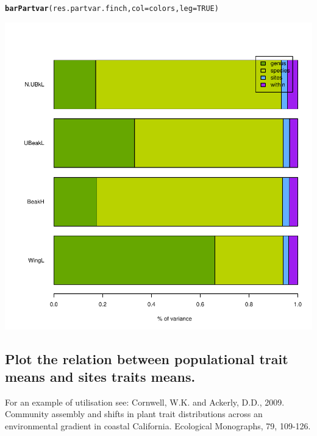 \documentclass[12pt]{article}\usepackage[]{graphicx}\usepackage[]{color}
\makeatletter
\def\maxwidth{ %
  \ifdim\Gin@nat@width>\linewidth
    \linewidth
  \else
    \Gin@nat@width
  \fi
}
\newcommand{\hlnum}[1]{\textcolor[rgb]{0.686,0.059,0.569}{#1}}%
\newcommand{\hlstd}[1]{\textcolor[rgb]{0.345,0.345,0.345}{#1}}%
\newcommand{\hlkwc}[1]{\textcolor[rgb]{0.333,0.667,0.333}{#1}}%
\newcommand{\hlkwd}[1]{\textcolor[rgb]{0.737,0.353,0.396}{\textbf{#1}}}%
\newenvironment{kframe}{%
 \def\at@end@of@kframe{}%
 \ifinner\ifhmode%
  \def\at@end@of@kframe{\end{minipage}}%
  \begin{minipage}{\columnwidth}%
 \fi\fi%
 \def\FrameCommand##1{\hskip\@totalleftmargin \hskip-\fboxsep
 \colorbox{shadecolor}{##1}\hskip-\fboxsep
     \hskip-\linewidth \hskip-\@totalleftmargin \hskip\columnwidth}%
 \MakeFramed {\advance\hsize-\width
   \@totalleftmargin\z@ \linewidth\hsize
   \@setminipage}}%
 {\par\unskip\endMakeFramed%
 \at@end@of@kframe}
\newenvironment{knitrout}{}{} %
\makeatother
\begin{document}
\begin{knitrout}
\color{fgcolor}\begin{kframe}
\begin{alltt}
\hlkwd{barPartvar}\hlstd{(res.partvar.finch,} \hlkwc{col} \hlstd{= colors,} \hlkwc{leg} \hlstd{=} \hlnum{TRUE}\hlstd{)}
\end{alltt}
\end{kframe}

{\centering \includegraphics[width=\maxwidth]{figure/unnamed-chunk-26-1} 

}



\end{knitrout}


\newpage

\subsection{Plot the relation between populational trait means and sites traits means.}

For an example of utilisation see: Cornwell, W.K. and Ackerly, D.D., 2009. Community assembly and shifts in plant trait distributions across an environmental gradient in coastal California. Ecological Monographs, 79, 109-126.
\end{document}
